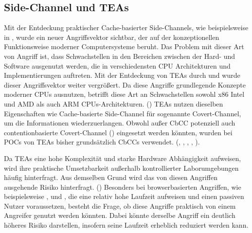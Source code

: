 \subsection{Side-Channel und \acfp{TEA}}
Mit der Entdeckung praktischer Cache-basierter Side-Channels,
wie beispielsweise in \cite{bernstein_cache-timing_2005},
wurde ein neuer Angriffsvektor sichtbar, der auf der
konzeptionellen Funktionsweise moderner Computersysteme
beruht.
Das Problem mit dieser Art von Angriff ist, dass Schwachstellen
in den Bereichen zwischen der Hard- und Software ausgenutzt
werden, die in verschiedensten
\ac{CPU} Architekturen und Implementierungen auftreten.
Mit der Entdeckung von \acp{TEA} durch \cite{kocher_spectre_2019}
und \cite{lipp_meltdown_2020} wurde dieser Angriffsvektor
weiter vergrößert. Da diese Angriffe grundlegende
Konzepte moderner \acp{CPU} ausnutzen, betrifft diese Art an
Schwachstellen sowohl x86 Intel und AMD als auch ARM
\acp{CPU}-Architekturen. (\cite[253,255]{canella_systematic_2019})
\acp{TEA} nutzen dieselben Eigenschaften wie
Cache-basierte Side-Channel für sogenannte Covert-Channel,
um die Informationen wiederzuerlangen. Obwohl außer \ac{CbCC}
potenziell auch contentionbasierte Covert-Channel
(\cite[2]{wang_covert_2006}) eingesetzt
werden könnten, wurden bei \acp{POC} von \acp{TEA}
bisher grundsätzlich \acp{CbCC} verwendet.
(\cite[4,6]{kocher_spectre_2019},
\cite[4]{lipp_meltdown_2020}, \cite[7]{schwarz_zombieload_2019},
\cite[6]{kim_slap_2025}, \cite[91]{van_schaik_ridl_2019}).

Da \acp{TEA} eine hohe Komplexität
und starke Hardware Abhängigkeit aufweisen, wird ihre praktische
Umsetzbarkeit außerhalb kontrollierter
Laborumgebungen häufig hinterfragt. Aus demselben Grund wird
das von diesen Angriffen ausgehende Risiko hinterfragt.
(\cite[293,296]{shepherd_transient_2022})
Besonders bei browserbasierten Angriffen, wie beispielsweise
\cite{kim_ileakage_2023}, \cite{kim_slap_2025} und
\cite{kim_flop_2025}, die eine relativ hohe Laufzeit aufweisen
und einen passiven Nutzer voraussetzen, besteht die Frage,
ob diese Angriffe praktisch von einem Angreifer genutzt werden
könnten. Dabei könnte derselbe Angriff ein deutlich höheres
Risiko darstellen, insofern seine Laufzeit erheblich reduziert
werden kann.


